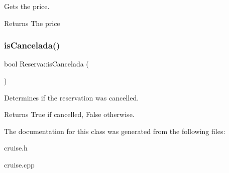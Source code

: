 Gets the price. 

\begin{DoxyReturn}{Returns}
The price 
\end{DoxyReturn}
\mbox{\label{classReserva_a1fb3e7e1dfce5960dc888ac9929f014f}} 
\subsubsection{\texorpdfstring{is\+Cancelada()}{isCancelada()}}
{\footnotesize\ttfamily bool Reserva\+::is\+Cancelada (\begin{DoxyParamCaption}{ }\end{DoxyParamCaption})\hspace{0.3cm}{\ttfamily [inline]}}



Determines if the reservation was cancelled. 

\begin{DoxyReturn}{Returns}
True if cancelled, False otherwise. 
\end{DoxyReturn}


The documentation for this class was generated from the following files\+:\begin{DoxyCompactItemize}
\item 
cruise.\+h\item 
cruise.\+cpp\end{DoxyCompactItemize}
